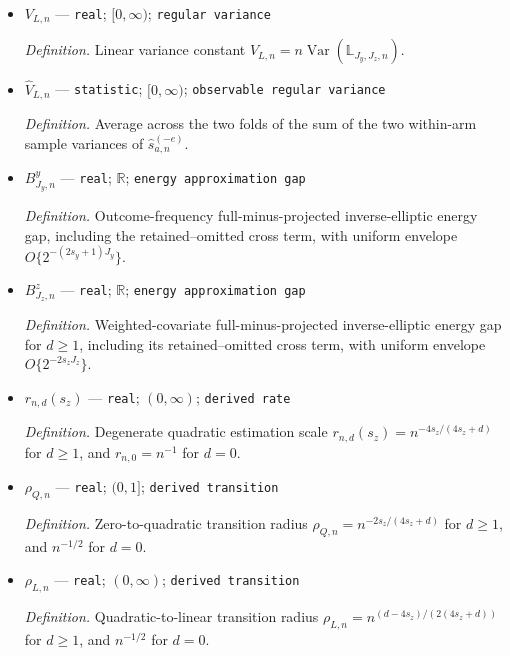 \documentclass{article}
\begin{document}
\begin{itemize}
  \par\smallskip\noindent\emph{Definition.} \texttt{Equal-\allowbreak{}weight two-\allowbreak{}fold average of the centered exact population first-\allowbreak{}order transport scores evaluated on the independent evaluation observations.}
  \item \(V_{L,n}\) --- \texttt{real}; \([0,\infty)\); \texttt{regular variance}
  \par\smallskip\noindent\emph{Definition.} Linear variance constant \(V_{L,n}=n\operatorname{Var}(\mathbb L_{J_y,J_z,n})\).
  \item \(\widehat V_{L,n}\) --- \texttt{statistic}; \([0,\infty)\); \texttt{observable regular variance}
  \par\smallskip\noindent\emph{Definition.} Average across the two folds of the sum of the two within-arm sample variances of \(\widehat s_{a,n}^{(-e)}\).
  \item \(B^y_{J_y,n}\) --- \texttt{real}; \(\mathbb R\); \texttt{energy approximation gap}
  \par\smallskip\noindent\emph{Definition.} Outcome-frequency full-minus-projected inverse-elliptic energy gap, including the retained--omitted cross term, with uniform envelope \(O\{2^{-(2s_y+1)J_y}\}\).
  \item \(B^z_{J_z,n}\) --- \texttt{real}; \(\mathbb R\); \texttt{energy approximation gap}
  \par\smallskip\noindent\emph{Definition.} Weighted-covariate full-minus-projected inverse-elliptic energy gap for \(d\ge1\), including its retained--omitted cross term, with uniform envelope \(O\{2^{-2s_zJ_z}\}\).
  \item \(r_{n,d}(s_z)\) --- \texttt{real}; \((0,\infty)\); \texttt{derived rate}
  \par\smallskip\noindent\emph{Definition.} Degenerate quadratic estimation scale \(r_{n,d}(s_z)=n^{-4s_z/(4s_z+d)}\) for \(d\ge1\), and \(r_{n,0}=n^{-1}\) for \(d=0\).
  \item \(\rho_{Q,n}\) --- \texttt{real}; \((0,1]\); \texttt{derived transition}
  \par\smallskip\noindent\emph{Definition.} Zero-to-quadratic transition radius \(\rho_{Q,n}=n^{-2s_z/(4s_z+d)}\) for \(d\ge1\), and \(n^{-1/2}\) for \(d=0\).
  \item \(\rho_{L,n}\) --- \texttt{real}; \((0,\infty)\); \texttt{derived transition}
  \par\smallskip\noindent\emph{Definition.} Quadratic-to-linear transition radius \(\rho_{L,n}=n^{(d-4s_z)/(2(4s_z+d))}\) for \(d\ge1\), and \(n^{-1/2}\) for \(d=0\).

\end{itemize}
\end{document}
